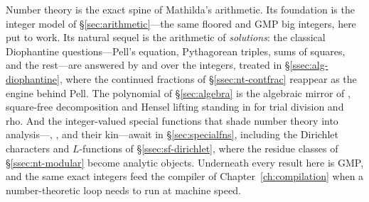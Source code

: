 Number theory is the exact spine of Mathilda's arithmetic. Its foundation is the integer
model of \S\ref{sec:arithmetic}---the same floored  and GMP big integers, here put
to work. Its natural sequel is the arithmetic of \emph{solutions}: the classical Diophantine
questions---Pell's equation, Pythagorean triples, sums of squares, and the rest---are
answered by  and  over the integers, treated in
\S\ref{ssec:alg-diophantine}, where the continued fractions of \S\ref{ssec:nt-contfrac}
reappear as the engine behind Pell. The polynomial  of \S\ref{sec:algebra} is the
algebraic mirror of , square-free decomposition and Hensel lifting
standing in for trial division and rho. And the integer-valued special functions that shade
number theory into analysis---, , and their kin---await in
\S\ref{sec:specialfns}, including the Dirichlet characters and \(L\)-functions of
\S\ref{ssec:sf-dirichlet}, where the residue classes of \S\ref{ssec:nt-modular} become
analytic objects. Underneath every result here is GMP, and the same exact integers
feed the compiler of Chapter~\ref{ch:compilation} when a number-theoretic loop needs to run
at machine speed.
